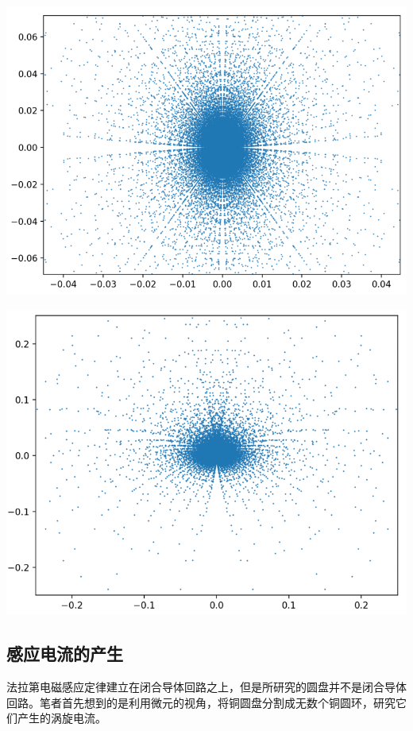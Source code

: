\documentclass{CLGPY}
\begin{document}
\begin{multicols}{1}
        \begin{center}
            \includegraphics[scale=.2]{./fig/20210618231224.png}
        \end{center}

        \begin{center}
            \includegraphics[scale=.2]{./fig/20210618231304.png}
        \end{center}

\subsection{感应电流的产生}
法拉第电磁感应定律建立在闭合导体回路之上，但是所研究的圆盘并不是闭合导体回路。笔者首先想到的是利用微元的视角，将铜圆盘分割成无数个铜圆环，研究它们产生的涡旋电流。


\end{multicols}
\end{document}
